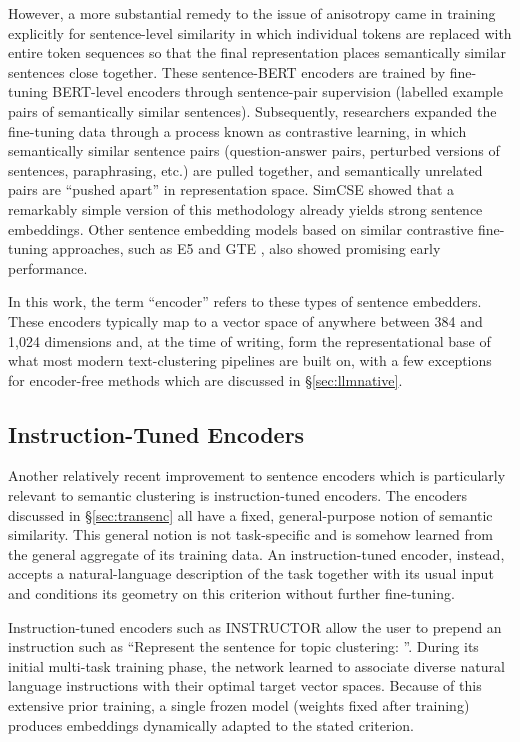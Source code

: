 \documentclass[11pt,a4paper,oneside]{report}
\begin{document}
However, a more substantial remedy to the issue of anisotropy came in training explicitly for sentence-level similarity in which individual tokens are replaced with entire token sequences so that the final representation places semantically similar sentences close together. These sentence-BERT \citep{reimers2019sbert} encoders are trained by fine-tuning BERT-level encoders through sentence-pair supervision (labelled example pairs of semantically similar sentences). Subsequently, researchers expanded the fine-tuning data through a process known as contrastive learning, in which semantically similar sentence pairs (question-answer pairs, perturbed versions of sentences, paraphrasing, etc.) are pulled together, and semantically unrelated pairs are ``pushed apart'' in representation space. SimCSE  \citep{gao2021simcse} showed that a remarkably simple version of this methodology already yields strong sentence embeddings. Other sentence embedding models based on similar contrastive fine-tuning approaches, such as E5 \citep{wang2022e5} and GTE \citep{li2023gte}, also showed promising early performance.

In this work, the term ``encoder'' refers to these types of sentence embedders. These encoders typically map to a vector space of anywhere between 384 and 1{,}024 dimensions and, at the time of writing, form the representational base of what most modern text-clustering pipelines are built on, with a few exceptions for encoder-free methods which are discussed in \S\ref{sec:llmnative}.

\subsection{Instruction-Tuned Encoders}

Another relatively recent improvement to sentence encoders which is particularly relevant to semantic clustering is instruction-tuned encoders. The encoders discussed in \S\ref{sec:transenc} all have a fixed, general-purpose notion of semantic similarity. This general notion is not task-specific and is somehow learned from the general aggregate of its training data. An instruction-tuned encoder, instead, accepts a natural-language description of the task together with its usual input and conditions its geometry on this criterion without further fine-tuning.

Instruction-tuned encoders such as INSTRUCTOR \citep{su2023instructor} allow the user to prepend an instruction such as ``Represent the sentence for topic clustering: ''. During its initial multi-task training phase, the network learned to associate diverse natural language instructions with their optimal target vector spaces. Because of this extensive prior training, a single frozen model (weights fixed after training) produces embeddings dynamically adapted to the stated criterion.
\end{document}
